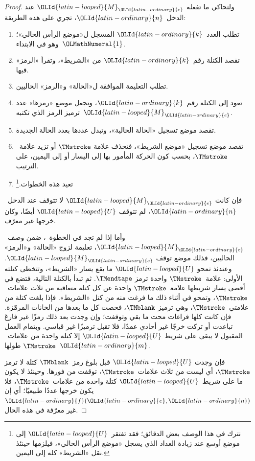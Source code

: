\documentclass[../../../include/open-logic-section]{subfiles}
\begin{document}
\begin{proof}
  ولتحاكي ما تفعله ${\OLId{latin-looped}{M}}_{\OLId{latin-ordinary}{e}}$ عند الدخل~${\OLId{latin-ordinary}{n}}$، تجري على هذه الطريقة:
  \begin{enumerate}
    \item تطلب العدد~${\OLId{latin-ordinary}{k}}$ المسجل ل«موضع الرأس الحالي»؛ وهو في
    الابتداء~${\OLMathNumeral{1}}$.
    \item تقصد الكتلة رقم~${\OLId{latin-ordinary}{k}}$ من «الشريط»، وتقرأ «الرمز» فيها.
    \item{}%
    تطلب التعليمة الموافقة ل«الحالة» و«الرمز» الحاليين.
    \item تعود إلى الكتلة رقم~${\OLId{latin-ordinary}{k}}$، وتجعل موضع «رمزها» عدد ترميز
    الرمز الذي تكتبه~${\OLId{latin-looped}{M}}_{\OLId{latin-ordinary}{e}}$.
    \item تقصد موضع تسجيل «الحالة الحالية»، وتبدل عددها بعدد
    الحالة الجديدة.
    \item تقصد موضع تسجيل «موضع الشريط»، فتحذف علامة
    $\TMstroke$ أو تزيد علامة~$\TMstroke$، بحسب كون الحركة
    المأمور بها إلى اليسار أو إلى اليمين، على الترتيب.
    \item تعيد هذه الخطوات.\footnote{نترك في هذا الوصف بعض
    الدقائق؛ فقد تفتقر~${\OLId{latin-looped}{U}}$ إلى موضع أوسع عند زيادة العداد الذي
    يسجل «موضع الرأس الحالي»، فيلزمها حينئذ نقل «الشريط» كله
    إلى اليمين.}
  \end{enumerate}
  فإن كانت ${\OLId{latin-looped}{M}}_{\OLId{latin-ordinary}{e}}$ لا تتوقف عند الدخل~${\OLId{latin-ordinary}{n}}$، لم تتوقف ${\OLId{latin-looped}{U}}$ أيضًا،
  وكان خرجها غير معرّف.

  وأما إذا لم تجد في الخطوة~، ضمن وصف~${\OLId{latin-looped}{M}}_{\OLId{latin-ordinary}{e}}$،
  تعليمة لزوج «الحالة» و«الرمز» الحاليين، فذلك موضع توقف ${\OLId{latin-looped}{M}}_{\OLId{latin-ordinary}{e}}$.
  وعندئذ تمحو ${\OLId{latin-looped}{U}}$ ما يقع يسار «الشريط»، وتتخطى كتلته الأولى:
  علامة~$\TMstroke$ واحدة ترمز $\TMendtape$. ثم تبدأ بالكتلة
  التالية، فتضع في أقصى يسار شريطها علامة~$\TMstroke$ واحدة
  عن كل كتلة متعاقبة من ثلاث علامات~$\TMstroke$، وتمحو في أثناء
  ذلك ما فرغت منه من كتل «الشريط». فإذا بلغت كتلة من
  علامتي~$\TMstroke$، وهي ترميز $\TMblank$، فحصت كل ما بعدها من
  الخانات المرمّزة. فإن كانت كلها فراغات محت ما بقي وتوقفت؛ وإن
  وجدت بعد ذلك رمزًا غير فارغ تباعدت أو تركت خرجًا غير أحادي عمدًا،
  فلا تقبل ترميزًا غير قياسي. وبتمام العمل المقبول لا يبقى على شريط
  ${\OLId{latin-looped}{U}}$ إلا كتلة واحدة من علامات~$\TMstroke$ طولها~${\OLId{latin-ordinary}{m}}$.


  فإن وجدت ${\OLId{latin-looped}{U}}$ قبل بلوغ رمز~$\TMblank$ كتلة لا ترمز
  $\TMstroke$، أي ليست من ثلاث علامات~$\TMstroke$، توقفت من
  فورها. وحينئذ لا يكون ما على شريط~${\OLId{latin-looped}{U}}$ كتلة واحدة من
  علامات~$\TMstroke$، فلا يكون خرجها عددًا طبيعيًا؛ أي إن
  ${\OLId{latin-ordinary}{f}}({\OLId{latin-ordinary}{e}},{\OLId{latin-ordinary}{n}})$ غير معرّفة في هذه الحال.
\end{proof}
\end{document}
